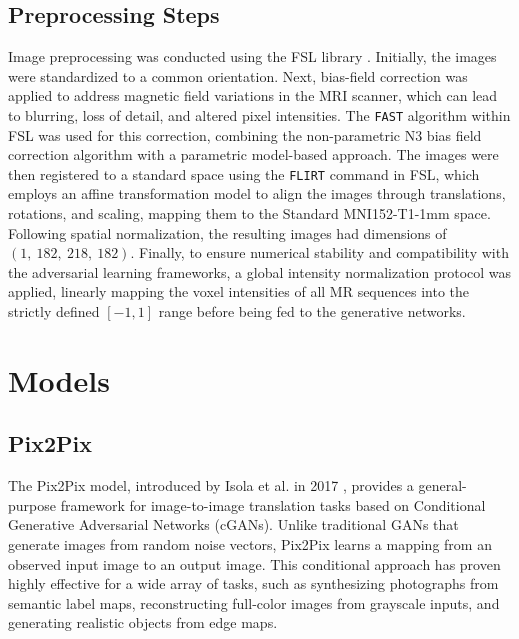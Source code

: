 \documentclass[11pt,a4paper]{article}
\begin{document}
\subsection{Preprocessing Steps}
\label{subsec:preprocessing}
Image preprocessing was conducted using the FSL library \citep{fsl1, fsl2}. Initially, the images were standardized to a common orientation. Next, bias-field correction was applied to address magnetic field variations in the MRI scanner, which can lead to blurring, loss of detail, and altered pixel intensities. The \texttt{FAST} algorithm within FSL was used for this correction, combining the non-parametric N3 bias field correction algorithm with a parametric model-based approach. The images were then registered to a standard space using the \texttt{FLIRT} command in FSL, which employs an affine transformation model to align the images through translations, rotations, and scaling, mapping them to the Standard MNI152-T1-1mm space. Following spatial normalization, the resulting images had dimensions of $(1, \ 182, \ 218, \ 182)$. Finally, to ensure numerical stability and compatibility with the adversarial learning frameworks, a global intensity normalization protocol was applied, linearly mapping the voxel intensities of all MR sequences into the strictly defined $[-1, 1]$ range before being fed to the generative networks.


\section{Models}
\label{sec: 4}

\subsection{Pix2Pix}

The Pix2Pix model, introduced by Isola et al. in 2017 \cite{pix2pix}, provides a general-purpose framework for image-to-image translation tasks based on Conditional Generative Adversarial Networks (cGANs). Unlike traditional GANs that generate images from random noise vectors, Pix2Pix learns a mapping from an observed input image to an output image. This conditional approach has proven highly effective for a wide array of tasks, such as synthesizing photographs from semantic label maps, reconstructing full-color images from grayscale inputs, and generating realistic objects from edge maps.
\end{document}

